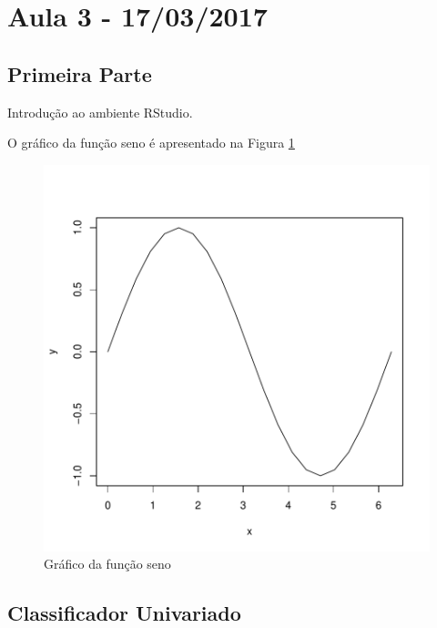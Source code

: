 \documentclass{article}
\begin{document}


\section{Aula 3 - 17/03/2017}


\subsection{Primeira Parte}
Introdução ao ambiente RStudio.


O gráfico da função seno é apresentado na Figura \ref{Fig1}
\begin{figure}[h]
\centering
\includegraphics{aula3-002}
\caption{Gráfico da função seno}
\label{Fig1}
\end{figure}


\subsection{Classificador Univariado}
\end{document}
